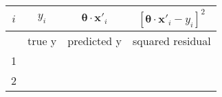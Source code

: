 \documentclass[11pt]{article}
\begin{document}
\begin{longtable}[]{@{}cccc@{}}
\toprule
\begin{minipage}[b]{0.07\columnwidth}\centering\strut
\(i\)\strut
\end{minipage} & \begin{minipage}[b]{0.10\columnwidth}\centering\strut
\(y_i\)\strut
\end{minipage} & \begin{minipage}[b]{0.23\columnwidth}\centering\strut
\(\boldsymbol{\theta}\cdot\mathbf{x}'_i\)\strut
\end{minipage} & \begin{minipage}[b]{0.33\columnwidth}\centering\strut
\(\left[ \boldsymbol{\theta}\cdot\mathbf{x}'_i - y_i\right]^2\)\strut
\end{minipage}\tabularnewline
\midrule
\endhead
\begin{minipage}[t]{0.07\columnwidth}\centering\strut
\strut
\end{minipage} & \begin{minipage}[t]{0.10\columnwidth}\centering\strut
true y\strut
\end{minipage} & \begin{minipage}[t]{0.23\columnwidth}\centering\strut
predicted y\strut
\end{minipage} & \begin{minipage}[t]{0.33\columnwidth}\centering\strut
squared residual\strut
\end{minipage}\tabularnewline
\begin{minipage}[t]{0.07\columnwidth}\centering\strut
1\strut
\end{minipage} & \begin{minipage}[t]{0.10\columnwidth}\centering\strut
\strut
\end{minipage} & \begin{minipage}[t]{0.23\columnwidth}\centering\strut
\strut
\end{minipage} & \begin{minipage}[t]{0.33\columnwidth}\centering\strut
\strut
\end{minipage}\tabularnewline
\begin{minipage}[t]{0.07\columnwidth}\centering\strut
2\strut
\end{minipage} & \begin{minipage}[t]{0.10\columnwidth}\centering\strut
\strut
\end{minipage} & \begin{minipage}[t]{0.23\columnwidth}\centering\strut
\strut

\end{minipage}
\end{longtable}
\end{document}

